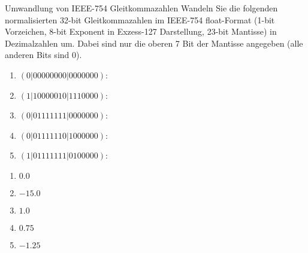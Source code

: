 \documentclass{article}
\begin{document}
\begin{exercise}{Umwandlung von IEEE-754 Gleitkommazahlen}
  Wandeln Sie die folgenden normalisierten 32-bit Gleitkommazahlen im IEEE-754 float-Format (1-bit Vorzeichen, 8-bit Exponent in Exzess-127 Darstellung, 23-bit Mantisse) in Dezimalzahlen um. Dabei sind nur die oberen 7 Bit der Mantisse angegeben (alle anderen Bits sind 0).
  \begin{enumerate}
    \item $(0|0000 0000|0000 000)$:
    \item $(1|1000 0010|1110 000)$:
    \item $(0|0111 1111|0000 000)$:
    \item $(0|0111 1110|1000 000)$:
    \item $(1|0111 1111|0100 000)$:
  \end{enumerate}

  \begin{solution}
    \begin{enumerate}
      \item $0.0$
      \item $-15.0$
      \item $1.0$
      \item $0.75$
      \item $-1.25$
    \end{enumerate}
  \end{solution}
\end{exercise}
\end{document}
